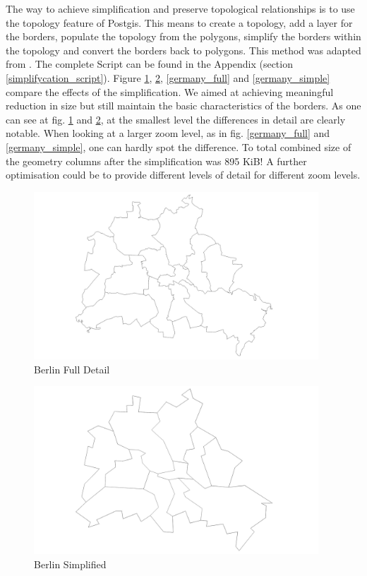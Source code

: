 \documentclass[paper=a4, fontsize=11pt]{article} %
\numberwithin{equation}{section} %
\numberwithin{figure}{section} %
\numberwithin{table}{section} %
\begin{document}
The way to achieve simplification and preserve topological relationships is to use the topology feature of Postgis. This means to create a topology, add a layer for the borders, populate the topology from the polygons, simplify the borders within the topology and convert the borders back to polygons. This method was adapted from \cite{website:strks-blog}. The complete Script can be found in the Appendix (section \ref{simplifycation_script}). Figure \ref{borders_full}, \ref{borders_simple}, \ref{germany_full} and \ref{germany_simple} compare the effects of the simplification. We aimed at achieving meaningful reduction in size but still maintain the basic characteristics of the borders. As one can see at fig. \ref{borders_full} and \ref{borders_simple}, at the smallest level the differences in detail are clearly notable. When looking at a larger zoom level, as in fig. \ref{germany_full} and \ref{germany_simple}, one can hardly spot the difference. To total combined size of the geometry columns after the simplification was 895 KiB! A further optimisation could be to provide different levels of detail for different zoom levels.

\begin{figure}[htbp]
	\centering
	\includegraphics[trim = 0mm 0mm 0mm 0mm, clip, width=0.95\textwidth]{pictures/berlin_full}
	\caption{Berlin Full Detail}
	\label{borders_full}
\end{figure}

\begin{figure}[htbp]
	\centering
	\includegraphics[trim = 0mm 0mm 0mm 0mm, clip, width=0.95\textwidth]{pictures/berlin_simplified}
	\caption{Berlin Simplified}
	\label{borders_simple}
\end{figure}
\end{document}

